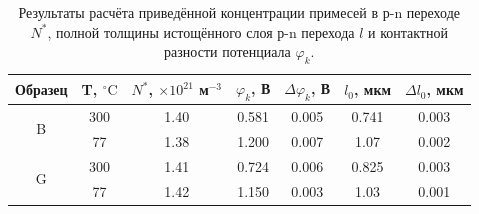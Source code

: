 \documentclass[14pt, russian, a4paper]{extarticle}
\begin{document}
\begin{table}[htbp]
\centering
\begin{tabular}{|c|c|c|c|c|c|c|}
\hline
Образец            & T, ${}^\circ\mathrm{C}$ & $N^*$, $\times10^{21}$ м${}^{-3}$ & $\varphi_k$, В & $\Delta\varphi_k$, В & $l_0$, мкм & $\Delta l_0$, мкм \\ \hline
\multirow{2}{*}{B} & 300                     & 1.40                              & 0.581          & 0.005                & 0.741      & 0.003             \\ \cline{2-7} 
                   & 77                      & 1.38                              & 1.200          & 0.007                & 1.07       & 0.002             \\ \hline
\multirow{2}{*}{G} & 300                     & 1.41                              & 0.724          & 0.006                & 0.825      & 0.003             \\ \cline{2-7} 
                   & 77                      & 1.42                              & 1.150          & 0.003                & 1.03       & 0.001             \\ \hline
\end{tabular}
\caption{Результаты расчёта приведённой концентрации примесей в р-n переходе $N^*$, полной толщины истощённого слоя р-n перехода $l$ и контактной разности потенциала $\varphi_k$.}
\label{tab:2}
\end{table}
\end{document}
